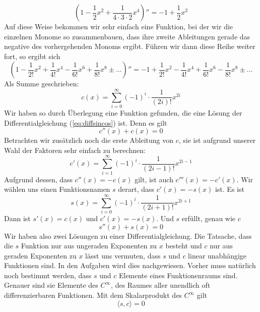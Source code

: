 \begin{equation}
\left(1 - \frac{1}{2}x^2 + \frac{1}{4\cdot 3\cdot 2} x^4 \right)'' = -1 +\frac{1}{2}x^2
\end{equation}
Auf diese Weise bekommen wir sehr einfach eine Funktion, bei der wir die einzelnen Monome so zusammenbauen, dass ihre zweite Ableitungen gerade das negative des vorhergehenden Monoms ergibt. Führen wir dann diese Reihe weiter fort, so ergibt sich
\begin{equation}
\left( 1-\frac{1}{2!}x^2 +\frac{1}{4!}x^4 -\frac{1}{6!}x^6+\frac{1}{8!}x^8 \pm \dots \right)'' =
-1+\frac{1}{2!}x^2 -\frac{1}{4!}x^4 +\frac{1}{6!}x^6 -\frac{1}{8!}x^8 \pm \dots
\end{equation}
Als Summe geschrieben:
\begin{equation}
c(x) = \sum_{i=0}^{\infty} (-1)^{i} \cdot \frac{1}{(2i)!} x^{2i}
\end{equation}
Wir haben so durch Überlegung eine Funktion gefunden, die eine Lösung der Differentialgleichung (\ref{eq:diffsincos}) ist. Denn es gilt
\begin{equation}
c''(x) +c(x) = 0
\end{equation}
Betrachten wir zusätzlich noch die erste Ableitung von $c$, sie ist aufgrund unserer Wahl der Faktoren sehr einfach zu berechnen:
\begin{equation}
c'(x) = \sum_{i=1}^{\infty} (-1)^{i}\cdot \frac{1}{(2i-1)!}x^{2i-1}
\end{equation}
Aufgrund dessen, dass $c''(x) = -c(x)$ gilt, ist auch $c'''(x) = -c'(x)$. Wir wählen uns einen Funktionsnamen $s$ derart, dass $c'(x) = -s(x)$ ist. Es ist
\begin{equation}
s(x) = \sum_{i=0}^{\infty} (-1)^i \cdot \frac{1}{(2i+1)!}x^{2i+1}
\end{equation}
Dann ist $s'(x) = c(x)$ und $c'(x) = -s(x)$. Und $s$ erfüllt, genau wie $c$
\begin{equation}
s''(x) +s(x) =0
\end{equation}
Wir haben also zwei Lösungen zu einer Differentialgleichung. Die Tatsache, dass die $s$ Funktion nur aus ungeraden Exponenten zu $x$ besteht und $c$ nur aus geraden Exponenten zu $x$ lässt uns vermuten, dass $s$ und $c$ linear unabhängige Funktionen sind. In den Aufgaben wird dies nachgewiesen. Vorher muss natürlich noch bestimmt werden, dass $s$ und $c$ Elemente eines Funktionenraums sind. Genauer sind sie Elemente des $C^{\infty}$, des Raumes aller unendlich oft differenzierbaren Funktionen. Mit dem Skalarprodukt des $C^\infty$ gilt
\begin{equation}
\langle s,c\rangle = 0
\end{equation}

